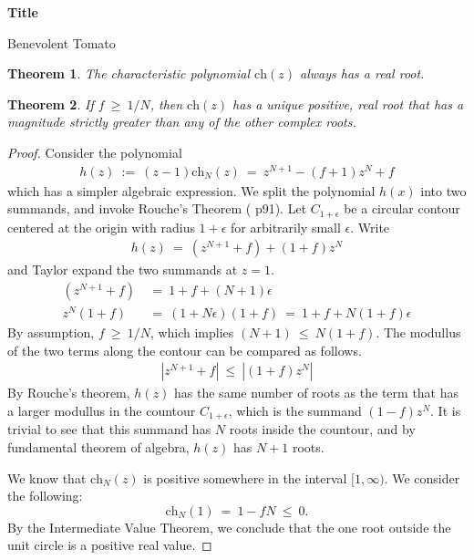 \documentclass{article}
\numberwithin{equation}{section}
\newtheorem{theorem}{Theorem}
\newcommand{\ch}{\text{ch}}
\begin{document}
\begin{center}
    \Large
    \textbf{Title}

    \large
    Benevolent Tomato
\end{center}





\begin{theorem}
    The characteristic polynomial $\ch(z)$ always has a real root. 
\end{theorem}

\begin{theorem}
    If $f \ \geq \ 1/N$, then $\ch(z)$ has a unique positive, real 
    root that has a magnitude strictly greater than any of the other 
    complex roots. 
\end{theorem}

\begin{proof}
    Consider the polynomial 
    \begin{align}
        h(z) \ := \ (z - 1) \ch_N(z) \ = \ z^{N + 1} - (f+1) z^N + f
    \end{align}
    which has a simpler algebraic expression. 
    We split the 
    polynomial $h(x)$ into two summands, and invoke Rouche's Theorem (\cite{SS03} p91). 
    Let $C_{1 + \epsilon}$ be a circular contour centered at the origin 
    with radius $1 + \epsilon$ for arbitrarily small $\epsilon$. 
    Write 
    \begin{align}
        h(z) \ = \ (z^{N + 1} + f) + (1 + f)z^N 
    \end{align}
    and Taylor expand the two summands at $z = 1$. 
    \begin{align}
        (z^{N + 1} + f) &\ = \ 1 + f + (N + 1) \epsilon \\ 
        z^N(1 + f) &\ = \ (1 + N \epsilon)  (1 + f) \ = \ 1 + f + N(1 + f)\epsilon
    \end{align}
    By assumption, $f \ \geq \ 1/N$, which implies $(N + 1) \ \leq \ N(1 + f)$. 
    The modullus of the two terms along the contour can be compared 
    as follows. 
    \begin{align}
        \left|z^{N + 1} + f\right| \ \leq \ \left|(1 + f)z^N\right|
    \end{align}
    By Rouche's theorem, $h(z)$ has the same number of roots as the 
    term that has a larger modullus in the countour $C_{1 + \epsilon}$, which is the 
    summand $(1-f)z^N$. It is trivial to see that this summand has $N$ 
    roots inside the countour, and by fundamental theorem of algebra, 
    $h(z)$ has $N + 1$ roots. 

    We know that $\ch_N(z)$ is positive somewhere in the interval $[1, \infty)$. 
    We consider the following:
    \begin{equation}
        \ch_N(1) \ =\  1 - fN \ \leq \ 0.  
    \end{equation}
    By the Intermediate Value Theorem, we conclude that the one root outside 
    the unit circle is a positive real value. 
\end{proof}
\end{document}
